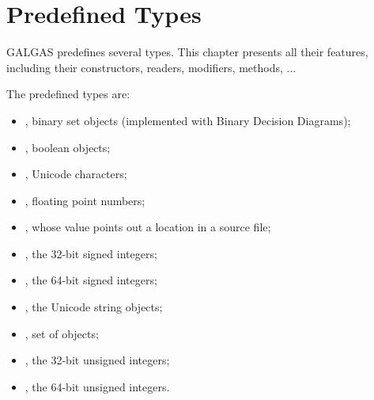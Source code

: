 
\chapter{Predefined Types} \label{predefinedTypes}

GALGAS predefines several types. This chapter presents all their features, including their constructors, readers, modifiers, methods, ...


\begin{description}
\item The predefined types are:
\begin{itemize}
\item {}, binary set objects (implemented with Binary Decision Diagrams);
\item {}, boolean objects;
\item {}, Unicode characters;
\item {}, floating point numbers;
\item {}, whose value points out a location in a source file;
\item {}, the 32-bit signed integers;
\item {}, the 64-bit signed integers;
\item {}, the Unicode string objects;
\item {}, set of  objects;
\item {}, the 32-bit unsigned integers;
\item {}, the 64-bit unsigned integers.
\end{itemize}
\end{description}

